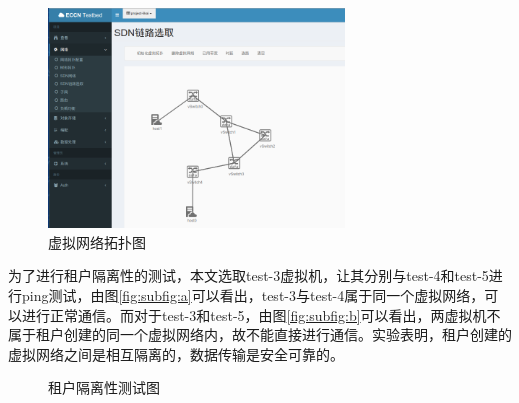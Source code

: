 \begin{figure}[!htb]
  \centering
  \includegraphics[width=0.7\textwidth,height=0.50\textwidth]{logo/virtualnet.png}
  \caption{虚拟网络拓扑图}
  \label{fig:virtualnet-test}
\end{figure}

为了进行租户隔离性的测试，本文选取test-3虚拟机，让其分别与test-4和test-5进行ping测试，由图\ref{fig:subfig:a}可以看出，test-3与test-4属于同一个虚拟网络，可以进行正常通信。而对于test-3和test-5，由图\ref{fig:subfig:b}可以看出，两虚拟机不属于租户创建的同一个虚拟网络内，故不能直接进行通信。实验表明，租户创建的虚拟网络之间是相互隔离的，数据传输是安全可靠的。

\begin{figure}
 \centering
 \caption{租户隔离性测试图}
 \label{fig:isolation} %
\end{figure}
